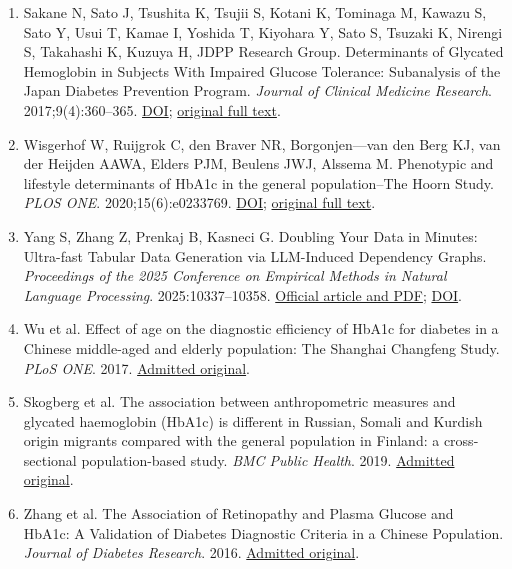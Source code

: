 \documentclass[sigconf,anonymous,review]{acmart}
\begin{document}
\begin{enumerate}
\item Sakane N, Sato J, Tsushita K, Tsujii S, Kotani K, Tominaga M, Kawazu S, Sato Y, Usui T, Kamae I, Yoshida T, Kiyohara Y, Sato S, Tsuzaki K, Nirengi S, Takahashi K, Kuzuya H, JDPP Research Group. Determinants of Glycated Hemoglobin in Subjects With Impaired Glucose Tolerance: Subanalysis of the Japan Diabetes Prevention Program. \emph{Journal of Clinical Medicine Research}. 2017;9(4):360–\allowbreak{}365. \href{https://doi.org/10.14740/jocmr2928w}{DOI}; \href{https://pmc.ncbi.nlm.nih.gov/articles/PMC5330780/}{original full text}.

\item Wisgerhof W, Ruijgrok C, den Braver NR, Borgonjen—van den Berg KJ, van der Heijden AAWA, Elders PJM, Beulens JWJ, Alssema M. Phenotypic and lifestyle determinants of HbA1c in the general population–\allowbreak{}The Hoorn Study. \emph{PLOS ONE}. 2020;15(6):e0233769. \href{https://doi.org/10.1371/journal.pone.0233769}{DOI}; \href{https://pmc.ncbi.nlm.nih.gov/articles/PMC7272077/}{original full text}.

\item Yang S, Zhang Z, Prenkaj B, Kasneci G. Doubling Your Data in Minutes: Ultra-fast Tabular Data Generation via LLM-Induced Dependency Graphs. \emph{Proceedings of the 2025 Conference on Empirical Methods in Natural Language Processing}. 2025:10337–\allowbreak{}10358. \href{https://aclanthology.org/2025.emnlp-main.525/}{Official article and PDF}; \href{https://doi.org/10.18653/v1/2025.emnlp-main.525}{DOI}.

\item Wu et al. Effect of age on the diagnostic efficiency of HbA1c for diabetes in a Chinese middle-aged and elderly population: The Shanghai Changfeng Study. \emph{PLoS ONE}. 2017. \href{https://pmc.ncbi.nlm.nih.gov/articles/PMC5591004/}{Admitted original}.

\item Skogberg et al. The association between anthropometric measures and glycated haemoglobin (HbA1c) is different in Russian, Somali and Kurdish origin migrants compared with the general population in Finland: a cross-sectional population-based study. \emph{BMC Public Health}. 2019. \href{https://pmc.ncbi.nlm.nih.gov/articles/PMC6458679/}{Admitted original}.

\item Zhang et al. The Association of Retinopathy and Plasma Glucose and HbA1c: A Validation of Diabetes Diagnostic Criteria in a Chinese Population. \emph{Journal of Diabetes Research}. 2016. \href{https://pmc.ncbi.nlm.nih.gov/articles/PMC5078665/}{Admitted original}.


\end{enumerate}
\end{document}
